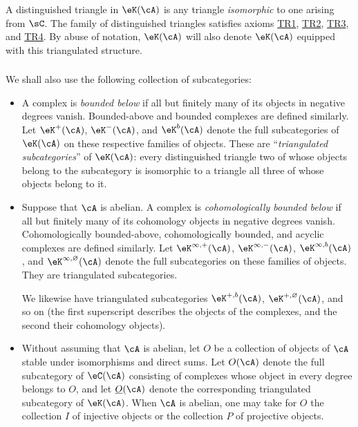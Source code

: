 \documentclass[12pt,oneside,english]{smfbook}
\begin{document}
A distinguished triangle in $\eK(\cA)$ is any triangle \emph{isomorphic} to one arising from $\sC$. The family of distinguished triangles satisfies axioms \hyperlink{VIII:TR1}{TR1}, \hyperlink{VIII:TR2}{TR2}, \hyperlink{VIII:TR3}{TR3}, and \hyperlink{VIII:TR4}{TR4}. By abuse of notation, $\eK(\cA)$ will also denote $\eK(\cA)$ equipped with this triangulated structure.

\subsubsection{}\label{VIII:1-2-3}

We shall also use the following collection of subcategories:
\begin{itemize}
  \item A complex is \emph{bounded below} if all but finitely many of its objects in negative degrees vanish. Bounded-above and bounded complexes are defined similarly. Let $\eK^+(\cA)$, $\eK^-(\cA)$, and $\eK^b(\cA)$ denote the full subcategories of $\eK(\cA)$ on these respective families of objects. These are ``\emph{triangulated subcategories}'' of $\eK(\cA)$: every distinguished triangle two of whose objects belong to the subcategory is isomorphic to a triangle all three of whose objects belong to it.
  \item Suppose that $\cA$ is abelian. A complex is \emph{cohomologically bounded below} if all but finitely many of its cohomology objects in negative degrees vanish. Cohomologically bounded-above, cohomologically bounded, and acyclic complexes are defined similarly. Let $\eK^{\infty,+}(\cA)$, $\eK^{\infty,-}(\cA)$, $\eK^{\infty,b}(\cA)$, and $\eK^{\infty,\varnothing}(\cA)$ denote the full subcategories on these families of objects. They are triangulated subcategories.

    We likewise have triangulated subcategories $\eK^{+,b}(\cA)$, $\eK^{+,\varnothing}(\cA)$, and so on (the first superscript describes the objects of the complexes, and the second their cohomology objects).
  \item Without assuming that $\cA$ is abelian, let $O$ be a collection of objects of $\cA$ stable under isomorphisms and direct sums. Let $O(\cA)$ denote the full subcategory of $\eC(\cA)$ consisting of complexes whose object in every degree belongs to $O$, and let $\underline O(\cA)$ denote the corresponding triangulated subcategory of $\eK(\cA)$. When $\cA$ is abelian, one may take for $O$ the collection $I$ of injective objects or the collection $P$ of projective objects.
\end{itemize}
\end{document}
